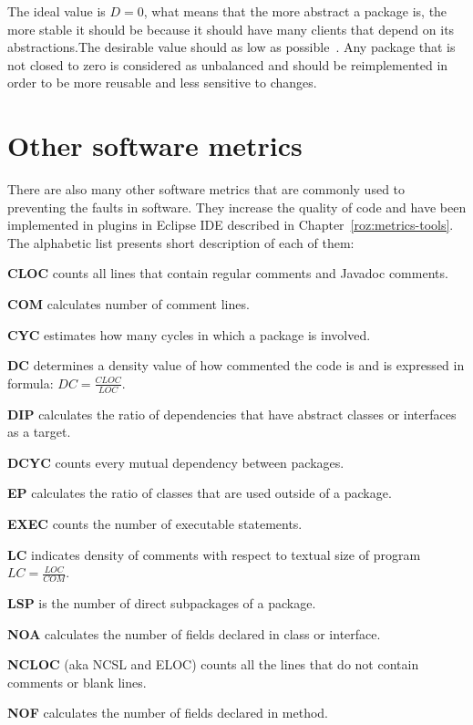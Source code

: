 The ideal value is $D=0$, what means that the more abstract a package is, the more stable it should be because it should have many clients that depend on its abstractions.The desirable value should as low as possible~\cite{martin}. Any package that is not closed to zero is considered as unbalanced and should be reimplemented in order to be more reusable and less sensitive to changes.

\section{Other software metrics}
There are also many other software metrics that are commonly used to preventing the faults in software. They increase the quality of code and have been implemented in plugins in Eclipse IDE described in Chapter~\ref{roz:metrics-tools}. The alphabetic list presents short description of each of them:  

\textbf{\ac{CLOC}} counts all lines that contain regular comments and Javadoc comments.

\textbf{\ac{COM}} calculates number of comment lines. 

\textbf{\ac{CYC}} estimates how many cycles in which a package is involved.

\textbf{\ac{DC}} determines a density value of how commented the code is and is expressed in formula: $DC = \frac{CLOC}{LOC}$.

\textbf{\ac{DIP}}  calculates the ratio of dependencies that have abstract classes or interfaces as a target.

\textbf{\ac{DCYC}} counts every mutual dependency between packages.

\textbf{\ac{EP}}  calculates the ratio of classes that are used outside of a package.

\textbf{\ac{EXEC}} counts the number of executable statements.	

\textbf{\ac{LC}} indicates density of comments with respect to textual size of program $LC=\frac {LOC}{COM}$.

\textbf{\ac{LSP}} is the number of direct subpackages of a package.

\textbf{\ac{NOA}}  calculates the number of fields declared in class or interface.

\textbf{\ac{NCLOC}} (aka NCSL and ELOC) counts all the lines that do not contain comments or blank lines.

\textbf{\ac{NOF}}  calculates the number of fields declared in method.

